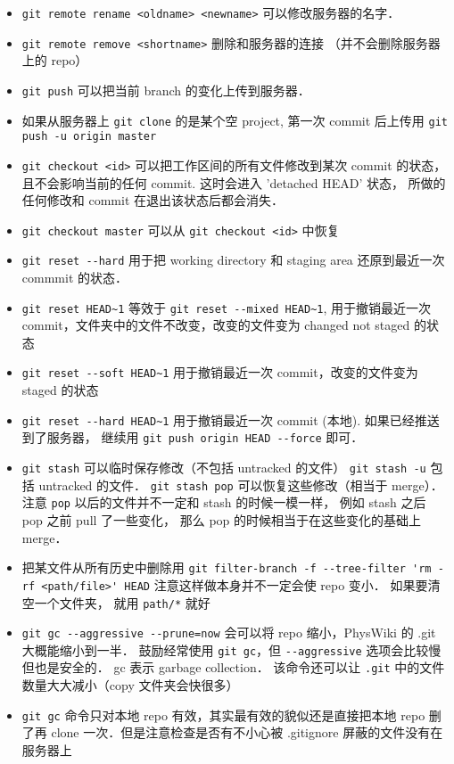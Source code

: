 \begin{itemize}
\item \verb|git remote rename <oldname> <newname>| 可以修改服务器的名字．
\item \verb|git remote remove <shortname>| 删除和服务器的连接 （并不会删除服务器上的 repo）
\item \verb|git push| 可以把当前 branch 的变化上传到服务器．
\item 如果从服务器上 \verb|git clone| 的是某个空 project, 第一次 commit 后上传用 \verb|git push -u origin master|
\item \verb|git checkout <id>| 可以把工作区间的所有文件修改到某次 commit 的状态， 且不会影响当前的任何 commit. 这时会进入 'detached HEAD' 状态， 所做的任何修改和 commit 在退出该状态后都会消失．
\item \verb|git checkout master| 可以从 \verb|git checkout <id>| 中恢复
\item \verb|git reset --hard| 用于把 working directory 和 staging area 还原到最近一次 commmit 的状态．
\item \verb|git reset HEAD~1| 等效于 \verb|git reset --mixed HEAD~1|, 用于撤销最近一次 commit，文件夹中的文件不改变，改变的文件变为 changed not staged 的状态
\item \verb|git reset --soft HEAD~1| 用于撤销最近一次 commit，改变的文件变为 staged 的状态
\item \verb|git reset --hard HEAD~1| 用于撤销最近一次 commit (本地). 如果已经推送到了服务器， 继续用 \verb|git push origin HEAD --force| 即可．
\item \verb|git stash| 可以临时保存修改（不包括 untracked 的文件） \verb|git stash -u| 包括 untracked 的文件． \verb|git stash pop| 可以恢复这些修改（相当于 merge）． 注意 \verb|pop| 以后的文件并不一定和 stash 的时候一模一样， 例如 stash 之后 pop 之前 pull 了一些变化， 那么 pop 的时候相当于在这些变化的基础上 merge．
\item 把某文件从所有历史中删除用 \verb|git filter-branch -f --tree-filter 'rm -rf <path/file>' HEAD| 注意这样做本身并不一定会使 repo 变小． 如果要清空一个文件夹， 就用 \verb|path/*| 就好
\item \verb|git gc --aggressive --prune=now| 会可以将 repo 缩小，PhysWiki 的 .git 大概能缩小到一半． 鼓励经常使用 \verb|git gc|，但 \verb|--aggressive| 选项会比较慢但也是安全的． gc 表示 garbage collection． 该命令还可以让 \verb|.git| 中的文件数量大大减小（copy 文件夹会快很多）
\item \verb|git gc| 命令只对本地 repo 有效，其实最有效的貌似还是直接把本地 repo 删了再 clone 一次．但是注意检查是否有不小心被 .gitignore 屏蔽的文件没有在服务器上

\end{itemize}

